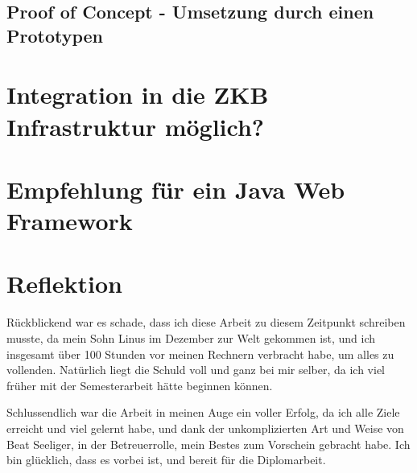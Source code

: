 \documentclass[
11pt, %
a4paper, %
BCOR25mm, %
DIV14, %
footsepline = false, %
headsepline, %
twoside, %
openright,
abstracton, %
listof=totocnumbered, %
bibliography=totocnumbered %
]{scrreprt}
\begin{document}
  \section{Proof of Concept - Umsetzung durch einen Prototypen}
  
  \chapter{Integration in die ZKB Infrastruktur möglich?}
  
  \chapter{Empfehlung für ein Java Web Framework}
  
  \chapter{Reflektion}
  
  Rückblickend war es schade, dass ich diese Arbeit zu diesem Zeitpunkt
  schreiben musste, da mein Sohn Linus im Dezember zur Welt gekommen ist, und
  ich insgesamt über 100 Stunden vor meinen Rechnern verbracht habe, um alles
  zu vollenden. Natürlich liegt die Schuld voll und ganz bei mir selber, da ich
  viel früher mit der Semesterarbeit hätte beginnen können.
  
  Schlussendlich war die Arbeit in meinen Auge ein voller Erfolg, da ich alle
  Ziele erreicht und viel gelernt habe, und dank der unkomplizierten Art und Weise von
  Beat Seeliger, in der Betreuerrolle, mein Bestes zum Vorschein gebracht habe.
  Ich bin glücklich, dass es vorbei ist, und bereit für die Diplomarbeit.
  
  
  \appendix
  
%  
  
  
\end{document}

